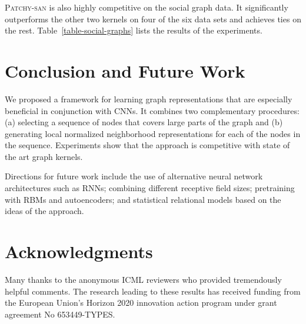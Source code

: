 \documentclass{article}
\begin{document}
\textsc{Patchy-san} is also highly competitive on the social graph data. It significantly outperforms the other two kernels  on four of the six data sets and achieves ties on the rest. Table~\ref{table-social-graphs} lists the results of the experiments.

\section{Conclusion and Future Work}

We proposed a framework for learning graph representations that are especially beneficial in conjunction with CNNs. It combines two complementary procedures: (a) selecting a sequence of nodes that covers large parts of the graph and (b) generating local normalized neighborhood representations for each of the nodes in the sequence.
Experiments show that the approach is competitive with state of the art graph kernels. 

Directions for future work include the use of alternative neural network architectures such as RNNs; combining different receptive field sizes; pretraining with RBMs and autoencoders; and statistical relational models based on the ideas of the approach. \vspace{-1mm}
\section*{Acknowledgments}
Many thanks to the anonymous ICML reviewers who provided tremendously helpful comments. The research leading to these results has received
funding from the European Union's Horizon 2020 innovation action program under grant agreement No 653449-TYPES.





\end{document}
